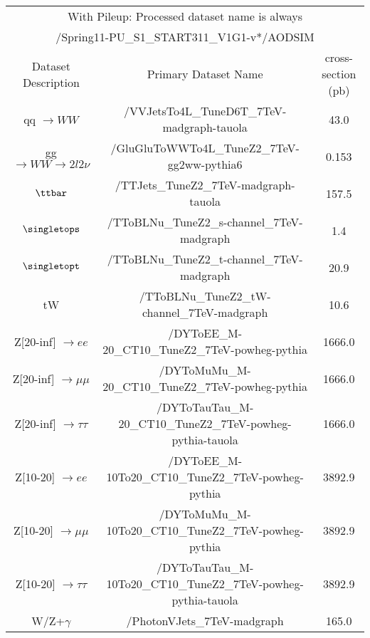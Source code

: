 \begin{table}[!ht]
\begin{center}
{\footnotesize
\begin{tabular}{|c|c|c|}
\hline
\multicolumn{3}{|c|}{With Pileup: Processed dataset name is always} \\
\multicolumn{3}{|c|}{/Spring11-PU\_S1\_START311\_V1G1-v*/AODSIM} \\
\hline
 Dataset Description                     &   Primary Dataset Name   & cross-section (pb)\\
\hline
qq $\rightarrow WW$                  	 &   /VVJetsTo4L\_TuneD6T\_7TeV-madgraph-tauola                        &  43.0  \\
gg $\rightarrow WW \to 2l 2\nu$          &   /GluGluToWWTo4L\_TuneZ2\_7TeV-gg2ww-pythia6                       &   0.153\\
$\ttbar$                              	 &   /TTJets\_TuneZ2\_7TeV-madgraph-tauola                             & 157.5 \\
$\singletops$                  	 	 &   /TToBLNu\_TuneZ2\_s-channel\_7TeV-madgraph                        &  1.4 \\
$\singletopt$                  	 	 &   /TToBLNu\_TuneZ2\_t-channel\_7TeV-madgraph                        &  20.9 \\
tW                                    	 &   /TToBLNu\_TuneZ2\_tW-channel\_7TeV-madgraph                       &  10.6 \\
Z[20-inf] $\rightarrow ee$	  	 &   /DYToEE\_M-20\_CT10\_TuneZ2\_7TeV-powheg-pythia                   &  1666.0 \\
Z[20-inf] $\rightarrow \mu\mu$        	 &   /DYToMuMu\_M-20\_CT10\_TuneZ2\_7TeV-powheg-pythia                 &  1666.0 \\	       
Z[20-inf] $\rightarrow \tau\tau$  	 &   /DYToTauTau\_M-20\_CT10\_TuneZ2\_7TeV-powheg-pythia-tauola        &  1666.0 \\
Z[10-20]  $\rightarrow ee$	  	 &   /DYToEE\_M-10To20\_CT10\_TuneZ2\_7TeV-powheg-pythia               &  3892.9 \\
Z[10-20]  $\rightarrow \mu\mu$    	 &   /DYToMuMu\_M-10To20\_CT10\_TuneZ2\_7TeV-powheg-pythia             &  3892.9 \\
Z[10-20]  $\rightarrow \tau\tau$  	 &   /DYToTauTau\_M-10To20\_CT10\_TuneZ2\_7TeV-powheg-pythia-tauola    &  3892.9 \\
W/Z+$\gamma$                       	 &   /PhotonVJets\_7TeV-madgraph                                       &  165.0 \\

\end{tabular}}
\end{center}
\end{table}
